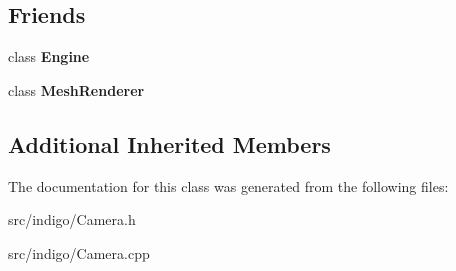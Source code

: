 \subsection*{Friends}
\begin{DoxyCompactItemize}
\item 
\mbox{\label{class_indigo_1_1_camera_a3e1914489e4bed4f9f23cdeab34a43dc}} 
class {\bfseries Engine}
\item 
\mbox{\label{class_indigo_1_1_camera_aeba626af0b56820b14192cd581ebbf77}} 
class {\bfseries Mesh\+Renderer}
\end{DoxyCompactItemize}
\subsection*{Additional Inherited Members}


The documentation for this class was generated from the following files\+:\begin{DoxyCompactItemize}
\item 
src/indigo/Camera.\+h\item 
src/indigo/Camera.\+cpp\end{DoxyCompactItemize}
